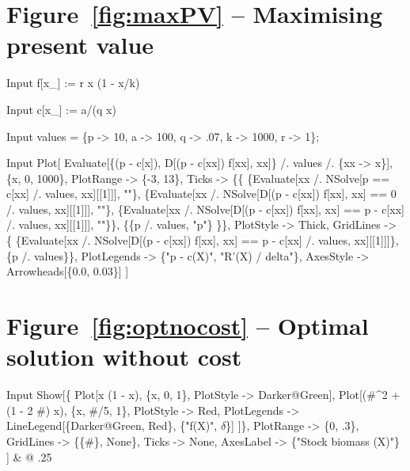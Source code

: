\documentclass[11pt,fleqn]{book} %
\begin{document}
\section*{Figure~\ref{fig:maxPV} -- Maximising present value }
\small{
\begin{mmaCell}[index=1]{Input}
  f[x_] := r x (1 - x/k)
\end{mmaCell}
\begin{mmaCell}{Input}
  c[x_] := a/(q x)
\end{mmaCell}
\begin{mmaCell}{Input}
  values = \{p -> 10, a -> 100, q -> .07, k -> 1000, r -> 1\};
\end{mmaCell}
\begin{mmaCell}{Input}
  Plot[
    Evaluate[\{(p - c[x]), D[(p - c[xx]) f[xx], xx]\} /. values /. \{xx -> x\}],
    \{x, 0, 1000\},
    PlotRange -> \{-3, 13\},
    Ticks -> \{\{
      \{Evaluate[xx /. NSolve[p == c[xx] /. values, xx][[1]]], ""\},
      \{Evaluate[xx /. NSolve[D[(p - c[xx]) f[xx], xx] == 0 /. values, xx][[1]]], 
        ""\},
      \{Evaluate[xx /. NSolve[D[(p - c[xx]) f[xx], xx] == p - c[xx] /. values, xx][[1]]], 
        ""\}\}, \{\{p /. values, "p"\}
      \}\},
     PlotStyle -> Thick,
     GridLines -> \{
       \{Evaluate[xx /. 
         NSolve[D[(p - c[xx]) f[xx], xx] == p - c[xx] /. values, xx][[1]]]\},
       \{p /. values\}\},
     PlotLegends -> \{"p - c(X)", "R'(X) / delta"\},
     AxesStyle -> Arrowheads[\{0.0, 0.03\}]
   ]
\end{mmaCell}
}

\section*{Figure~\ref{fig:optnocost} -- Optimal solution without cost }
\small{
\begin{mmaCell}[index=1]{Input}
  Show[\{
    Plot[x (1 - x), \{x, 0, 1\}, PlotStyle -> Darker@Green],
    Plot[(#^2 + (1 - 2 #) x), \{x, #/5, 1\}, 
      PlotStyle   -> Red, 
      PlotLegends -> LineLegend[\{Darker@Green, Red\}, \{"f(X)", \(\delta\)\}]
    ]\},
    PlotRange     -> \{0, .3\},
    GridLines     -> \{\{#\}, None\},
    Ticks         -> None,
    AxesLabel     -> \{"Stock biomass (X)"\}
  ] & @ .25
\end{mmaCell}
}
\end{document}
